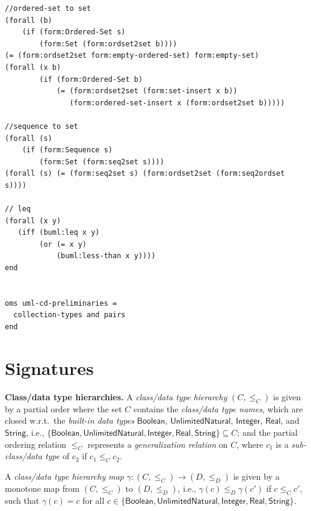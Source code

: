 \documentclass[10pt,fleqn,final]{scrreprt}
\newenvironment{definitions}[0]{\medskip }{}
\newcommand{\uml}[1]{\textsf{#1}}
\begin{document}
\begin{definitions}
\begin{lstlisting}[language=clif,morekeywords={then,with,logic,oms,end},mathescape]
//ordered-set to set
(forall (b)
	(if (form:Ordered-Set s)
	    (form:Set (form:ordset2set b))))
(= (form:ordset2set form:empty-ordered-set) form:empty-set)
(forall (x b)
        (if (form:Ordered-Set b)
            (= (form:ordset2set (form:set-insert x b))
               (form:ordered-set-insert x (form:ordset2set b)))))

//sequence to set
(forall (s)
	(if (form:Sequence s)
	    (form:Set (form:seq2set s))))
(forall (s) (= (form:seq2set s) (form:ordset2set (form:seq2ordset s))))

// leq
(forall (x y)
   (iff (buml:leq x y)
        (or (= x y)
            (buml:less-than x y))))
end


oms uml-cd-preliminaries =
  collection-types and pairs
end

\end{lstlisting}


\section{Signatures}

\medskip\noindent\textbf{Class/data type hierarchies.}  A
\emph{class/data type hierarchy} $(C, {\leq_C})$ is given by a partial
order where the set $C$ contains the \emph{class/data type names}, which
are closed w.r.t.\ the \emph{built-in data types} $\mathsf{Boolean}$,
$\mathsf{UnlimitedNatural}$, $\mathsf{Integer}$, $\mathsf{Real}$, and
$\mathsf{String}$, i.e.,
$\{ \mathsf{Boolean}, \mathsf{UnlimitedNatural},\allowbreak
\mathsf{Integer}, \mathsf{Real}, \mathsf{String} \} \subseteq
C$;
and the partial ordering relation $\leq_C$ represents a
\emph{generalization relation} on $C$, where $c_1$ is a
\emph{sub-class/data type} of $c_2$ if $c_1 \leq_C c_2$.

A \emph{class/data type hierarchy map}
$\gamma : (C, {\leq_C}) \to (D, {\leq_D})$ is given by a monotone map
from $(C, {\leq_C})$ to $(D, {\leq_D})$, i.e.,
$\gamma(c) \leq_D \gamma(c')$ if $c \leq_C c'$, such that
$\gamma(c) = c$ for all
$c \in \{ \mathsf{Boolean},\allowbreak \mathsf{UnlimitedNatural},\allowbreak
\mathsf{Integer}, \mathsf{Real}, \mathsf{String} \}$.


\end{definitions}
\end{document}
